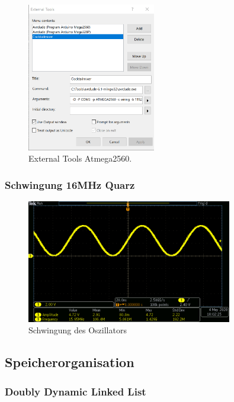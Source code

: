 \begin{figure}[H]
	\centering
	\includegraphics[width=0.5\textwidth]{graphics/AtmelStudio_External_Tools}
	\caption{External Tools Atmega2560.}
	\label{fig:AtmelStudio_External_Tools}
\end{figure}

\subsubsection{Schwingung 16MHz Quarz}

\begin{figure}[H]
\center
\includegraphics[width = 0.8\textwidth]{graphics/Crystal_Swing}
\caption{Schwingung des Oszillators}
\label{fig:Crystal_Swing}
\end{figure}

\subsection{Speicherorganisation}

\subsubsection{Doubly Dynamic Linked List}\label{Appendix:Lists}

